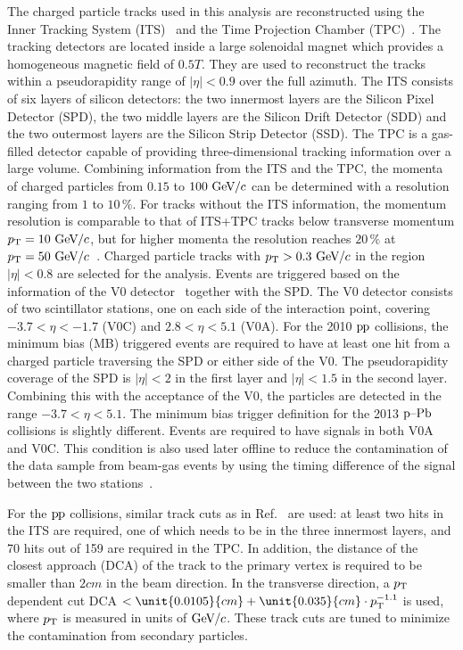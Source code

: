 The charged particle tracks used in this analysis are reconstructed using the Inner Tracking System (ITS)~\cite{aliceITS} and the Time Projection Chamber (TPC)~\cite{aliceTPC}. The tracking detectors are located inside a large solenoidal magnet which provides a homogeneous magnetic field of $\unit{0.5}{T}$. They are used to reconstruct the tracks within a pseudorapidity range of $|\eta| < 0.9$ over the full azimuth. The ITS consists of six layers of silicon detectors: the two innermost layers are the Silicon Pixel Detector (SPD), the two middle layers are the Silicon Drift Detector (SDD) and the two outermost layers are the Silicon Strip Detector (SSD). The TPC is a gas-filled detector capable of providing three-dimensional tracking information over a large volume. Combining information from the ITS and the TPC, the momenta of charged particles from $0.15$ to $100~\mathrm{GeV}\kern-0.05em/\kern-0.02em c$ can be determined with a resolution ranging from $1$ to $10\,\%$. For tracks without the ITS information, the momentum resolution is comparable to that of ITS+TPC tracks below transverse momentum $p_{\rm T} = 10~\mathrm{GeV}\kern-0.05em/\kern-0.02em c$, but for higher momenta the resolution reaches $20\,\%$ at $p_{\rm T} = 50~\mathrm{GeV}\kern-0.05em/\kern-0.02em c$~\cite{alicePerformance,aliceBackgroundFluctuation}. Charged particle tracks with $p_{\rm T} > 0.3~\mathrm{GeV}\kern-0.05em/\kern-0.02em c$ in the region $|\eta| < 0.8$ are selected for the analysis.
Events are triggered based on the information of the V0 detector~\cite{forwarddetectorsTdr} together with the SPD. The V0 detector consists of two scintillator stations, one on each side of the interaction point, covering $-3.7 < \eta < -1.7$ (V0C) and $2.8 < \eta < 5.1$ (V0A). For the 2010 $\mbox{p\kern-0.05em p}$ collisions, the minimum bias (MB) triggered events are required to have at least one hit from a charged particle traversing the SPD or either side of the V0. The pseudorapidity coverage of the SPD is $|\eta| < 2$ in the first layer and $|\eta| < 1.5$ in the second layer. Combining this with the acceptance of the V0, the particles are detected in the range $-3.7 < \eta < 5.1$. The minimum bias trigger definition for the 2013 $\mbox{p--Pb}$ collisions is slightly different. Events are required to have signals in both V0A and V0C. This condition is also used later offline to reduce the contamination of the data sample from beam-gas events by using the timing difference of the signal between the two stations~\cite{alicePerformance}.

For the $\mbox{p\kern-0.05em p}$ collisions, similar track cuts as in Ref.~\cite{ALICE:2011ac} are used: at least two hits in the ITS are required, one of which needs to be in the three innermost layers, and 70 hits out of 159 are required in the TPC. In addition, the distance of the closest approach (DCA) of the track to the primary vertex is required to be smaller than $\unit{2}{cm}$ in the beam direction. In the transverse direction, a $p_{\rm T}$ dependent cut DCA $< \unit{0.0105}{cm} + \unit{0.035}{cm} \cdot \pt{}^{-1.1}$ is used, where $p_{\rm T}$ is measured in units of $\mathrm{GeV}\kern-0.05em/\kern-0.02em c$. These track cuts are tuned to minimize the contamination from secondary particles.

